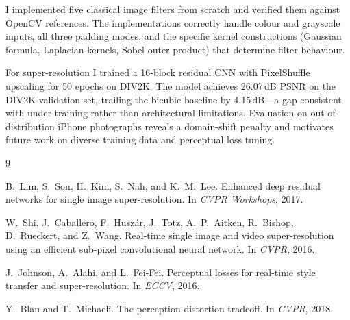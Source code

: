 \documentclass{article}
\begin{document}
I implemented five classical image filters from scratch and verified them
against OpenCV references.
The implementations correctly handle colour and grayscale inputs, all three
padding modes, and the specific kernel constructions (Gaussian formula,
Laplacian kernels, Sobel outer product) that determine filter behaviour.

For super-resolution I trained a 16-block residual CNN with PixelShuffle
upscaling for 50 epochs on DIV2K.
The model achieves 26.07\,dB PSNR on the DIV2K validation set, trailing the
bicubic baseline by 4.15\,dB---a gap consistent with under-training rather
than architectural limitations.
Evaluation on out-of-distribution iPhone photographs reveals a domain-shift
penalty and motivates future work on diverse training data and perceptual loss
tuning.


\begin{thebibliography}{9}

B.~Lim, S.~Son, H.~Kim, S.~Nah, and K.~M.~Lee.
\newblock Enhanced deep residual networks for single image super-resolution.
\newblock In \emph{CVPR Workshops}, 2017.

W.~Shi, J.~Caballero, F.~Husz{\'a}r, J.~Totz, A.~P.~Aitken, R.~Bishop,
D.~Rueckert, and Z.~Wang.
\newblock Real-time single image and video super-resolution using an efficient
sub-pixel convolutional neural network.
\newblock In \emph{CVPR}, 2016.

J.~Johnson, A.~Alahi, and L.~Fei-Fei.
\newblock Perceptual losses for real-time style transfer and super-resolution.
\newblock In \emph{ECCV}, 2016.

Y.~Blau and T.~Michaeli.
\newblock The perception-distortion tradeoff.
\newblock In \emph{CVPR}, 2018.

\end{thebibliography}
\end{document}
